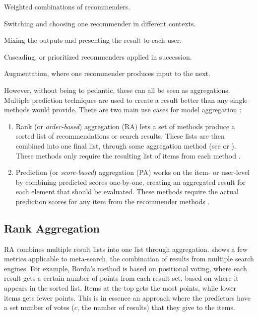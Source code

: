\begin{itemize*}
  \item Weighted combinations of recommenders.
  \item Switching and choosing one recommender in different contexts.
  \item Mixing the outputs and presenting the result to each user.
  \item Cascading, or prioritized recommenders applied in succession.
  \item Augmentation, where one recommender produces input to the next.
\end{itemize*}

However, without being to pedantic, these can all be seen as aggregations. 
Multiple prediction techniques are used
to create a result better than any single methods would provide.
There are two main use cases for model aggregation \cite{Liu2007}: 

\begin{enumerate}
  \item Rank (or \emph{order-based}) aggregation (RA) lets a set of methods
  produce a sorted list of recommendations or search results. These lists are then combined
  into one final list, through some aggregation method (see \cite{Dwork2001} or \cite{Klementiev2008}).
  These methods only require the resulting list of items from each method \cite{Aslam2001}.

  \item Prediction (or \emph{score-based}) aggregation (PA) works on the item- or user-level by combining predicted scores
  one-by-one, creating an aggregated result for each element that should be evaluated.
  These methods require the actual prediction scores for any item from the recommender methods \cite[p.2]{Aslam2001}.
\end{enumerate}

\subsection{Rank Aggregation}
\label{sec:theory:rank}

RA combines multiple result lists into one list through aggregation.
\cite{Dwork2001} shows a few metrics applicable to meta-search, the combination of results from multiple search engines.
For example, Borda's method \cite[p.6]{Dwork2001} is based on positional voting, where each result gets a certain number of points from each result set,
based on where it appears in the sorted list. Items at the top gets the most points, while lower items gets fewer points.
This is in essence an approach where the predictors have a set number of votes ($c$, the number of results) that they give to the items.

